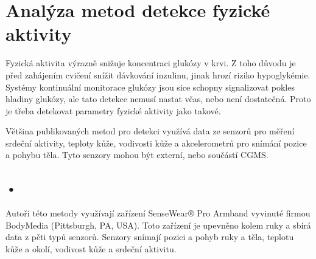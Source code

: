 \chapter{Analýza metod detekce fyzické aktivity}

Fyzická aktivita výrazně snižuje koncentraci glukózy v krvi. Z toho důvodu je před zahájením cvičení snížit dávkování inzulinu, jinak hrozí riziko hypoglykémie. Systémy kontinuální monitorace glukózy jsou sice schopny signalizovat pokles hladiny glukózy, ale tato detekce nemusí nastat včas, nebo není dostatečná. Proto je třeba detekovat parametry fyzické aktivity jako takové.

Většina publikovaných metod pro detekci využívá data ze senzorů pro měření srdeční aktivity, teploty kůže, vodivosti kůže a akcelerometrů pro snímání pozice a pohybu těla. Tyto senzory mohou být externí, nebo součástí CGMS.


\section{•}

Autoři této metody využívají zařízení SenseWear® Pro Armband vyvinuté firmou BodyMedia (Pittsburgh, PA, USA). Toto zařízení je upevněno kolem ruky a sbírá data z pěti typů senzorů. Senzory snímají pozici a pohyb ruky a těla, teplotu kůže a okolí, vodivost kůže a srdeční aktivitu.
